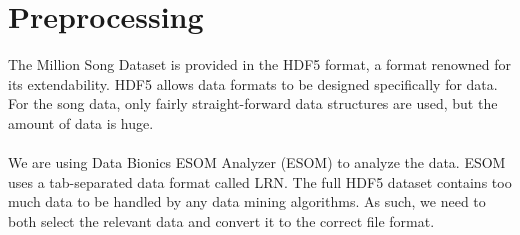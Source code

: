 \section{Preprocessing} %
\label{sec:preprocessing}

The Million Song Dataset is provided in the HDF5 format, a format renowned for its extendability. HDF5
allows data formats to be designed specifically for data. \citep{hdfgrp} For the song data, only fairly straight-forward data
structures are used, but the amount of data is huge.
\\\\
We are using Data Bionics ESOM Analyzer (ESOM) to analyze the data. ESOM uses a tab-separated data format called LRN. The full HDF5 dataset contains too much data to be handled by any data mining algorithms. As such, we need to both select the relevant data and convert it to the correct file format.



